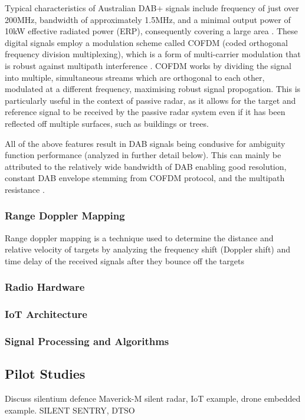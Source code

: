 \documentclass[12pt,a4paper]{article}
\begin{document}
\par \vspace{0.5cm} 
\noindent Typical characteristics of Australian DAB+ signals include frequency of just over 200MHz, bandwidth of approximately 1.5MHz, and a minimal output power of 10kW effective radiated power (ERP), consequently covering a large area \cite{DABfeatures}. These digital signals employ a modulation scheme called COFDM (coded orthogonal frequency division multiplexing), which is a form of multi-carrier modulation that is robust against multipath interference \cite{INTRO2017}. COFDM works by dividing the signal into multiple, simultaneous streams which are orthogonal to each other, modulated at a different frequency, maximising robust signal propogation. This is particularly useful in the context of passive radar, as it allows for the target and reference signal to be received by the passive radar system even if it has been reflected off multiple surfaces, such as buildings or trees.

\par \vspace{0.5cm} 
\noindent All of the above features result in DAB signals being condusive for ambiguity function performance (analyzed in further detail below). This can mainly be attributed to the relatively wide bandwidth of DAB enabling good resolution, constant DAB envelope stemming from COFDM protocol, and the multipath resistance \cite{DABambiguity}.
\subsubsection{Range Doppler Mapping}
Range doppler mapping is a technique used to determine the distance and relative velocity of targets by analyzing the frequency shift (Doppler shift) and time delay of the received signals after they bounce off the targets
\subsubsection{Radio Hardware}
\subsubsection{IoT Architecture}
\subsubsection{Signal Processing and Algorithms} 



\subsection{Pilot Studies}
Discuss silentium defence Maverick-M silent radar, IoT example, drone embedded example. SILENT SENTRY, DTSO
\end{document}
